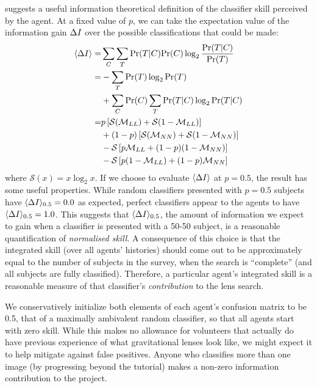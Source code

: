 \documentclass[useAMS,usenatbib,a4paper]{mn2e}
\begin{document}
 suggests a useful information theoretical 
definition of the classifier skill  perceived by the agent. At a fixed
value of $p$, we can take the expectation value of the information gain
$\Delta I$ over  the possible classifications that could be made:
\begin{align}
\langle\Delta I\rangle   =& \sum_C \sum_T {\rm Pr}(T|C) {\rm Pr}(C) \log_2 \frac{{\rm Pr}(T|C)}{{\rm Pr}(T)} \notag \\ 
         =& - \sum_T {\rm Pr}(T) \log_2 {\rm Pr}(T) \notag \\ 
          & + \sum_C {\rm Pr}(C) \sum_T {\rm Pr}(T|C) \log_2 {\rm Pr}(T|C) \notag \\ 
         =&         p  \left[ \mathcal{S}(\mathcal{M}_{LL}) + \mathcal{S}(1-\mathcal{M}_{LL}) \right] \notag \\
          &     +(1-p) \left[ \mathcal{S}(\mathcal{M}_{NN}) + \mathcal{S}(1-\mathcal{M}_{NN}) \right] \notag \\
          & - \mathcal{S}\left[ p    \mathcal{M}_{LL}       + (1-p)(1-\mathcal{M}_{NN})     \right] \notag \\
          & - \mathcal{S}\left[ p (1-\mathcal{M}_{LL})      + (1-p)   \mathcal{M}_{NN}      \right] 
\end{align}
where $\mathcal{S}(x) = x \log_2{x}$. If we choose to
evaluate $\langle\Delta I\rangle$ at $p = 0.5$, the result has some
useful properties. While random classifiers presented with  $p = 0.5$
subjects have ${\langle \Delta I \rangle_{0.5}} = 0.0$  as expected, perfect classifiers appear to
the agents to have  ${\langle \Delta I \rangle_{0.5}} = 1.0$. This suggests that  ${\langle \Delta I \rangle_{0.5}}$, the
amount of information we expect to  gain when a classifier is presented
with a 50-50 subject, is a reasonable quantification of 
\emph{normalised skill}. A consequence of this choice is that the
integrated skill (over all agents' histories) should come out to be
approximately 
equal to the number of subjects in the survey, when the search is
``complete'' (and all subjects are fully classified). Therefore, a
particular agent's integrated skill is a reasonable 
measure of that classifier's
\emph{contribution} to the lens search.

We conservatively initialize both elements of each  agent's confusion
matrix to be 0.5, that of a maximally ambivalent  random classifier, so
that all agents start with zero skill. While  this makes no allowance
for volunteers that actually do have previous experience of what
gravitational lenses look like, we might expect it to help mitigate
against false positives. Anyone who classifies more than one image (by
progressing beyond the tutorial) makes a non-zero information
contribution to the project.
\end{document}
